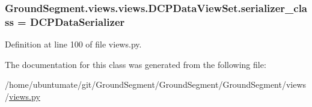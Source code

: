 \subsubsection[{serializer\+\_\+class}]{\setlength{\rightskip}{0pt plus 5cm}Ground\+Segment.\+views.\+views.\+D\+C\+P\+Data\+View\+Set.\+serializer\+\_\+class = {\bf D\+C\+P\+Data\+Serializer}\hspace{0.3cm}{\ttfamily [static]}}\label{class_ground_segment_1_1views_1_1views_1_1_d_c_p_data_view_set_a6a2dd822003bf0f82ef1cd60869de3ff}


Definition at line 100 of file views.\+py.



The documentation for this class was generated from the following file\+:\begin{DoxyCompactItemize}
\item 
/home/ubuntumate/git/\+Ground\+Segment/\+Ground\+Segment/\+Ground\+Segment/views/\hyperlink{views_8py}{views.\+py}\end{DoxyCompactItemize}
